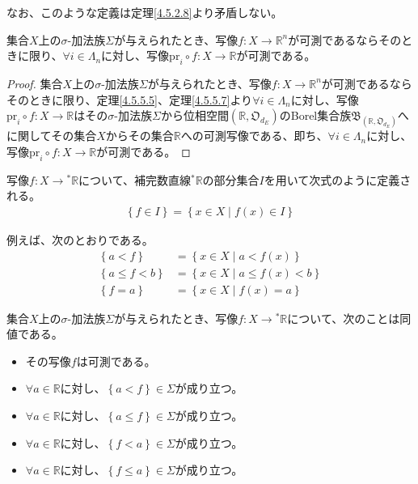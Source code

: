 \documentclass[dvipdfmx]{jsarticle}
\begin{document}
なお、このような定義は定理\ref{4.5.2.8}より矛盾しない。
\begin{thm}\label{4.5.5.8}
集合$X$上の$\sigma$-加法族$\varSigma$が与えられたとき、写像$f:X \rightarrow \mathbb{R}^{n}$が可測であるならそのときに限り、$\forall i \in \varLambda_{n}$に対し、写像$\mathrm{pr}_{i} \circ f:X \rightarrow \mathbb{R}$が可測である。
\end{thm}
\begin{proof}
集合$X$上の$\sigma$-加法族$\varSigma$が与えられたとき、写像$f:X \rightarrow \mathbb{R}^{n}$が可測であるならそのときに限り、定理\ref{4.5.5.5}、定理\ref{4.5.5.7}より$\forall i \in \varLambda_{n}$に対し、写像$\mathrm{pr}_{i} \circ f:X \rightarrow \mathbb{R}$はその$\sigma$-加法族$\varSigma$から位相空間$\left( \mathbb{R},\mathfrak{O}_{d_{E}} \right)$のBorel集合族$\mathfrak{B}_{\left( \mathbb{R},\mathfrak{O}_{d_{E}} \right)}$へに関してその集合$X$からその集合$\mathbb{R}$への可測写像である、即ち、$\forall i \in \varLambda_{n}$に対し、写像$\mathrm{pr}_{i} \circ f:X \rightarrow \mathbb{R}$が可測である。
\end{proof}
\begin{dfn}
写像$f:X \rightarrow{}^{*}\mathbb{R}$について、補完数直線${}^{*}\mathbb{R}$の部分集合$I$を用いて次式のように定義される。
\begin{align*}
\left\{ f \in I \right\} = \left\{ x \in X \middle| f(x) \in I \right\}
\end{align*}
\end{dfn}\par
例えば、次のとおりである。
\begin{align*}
\left\{ a < f \right\} &= \left\{ x \in X \middle| a < f(x) \right\}\\
\left\{ a \leq f < b \right\} &= \left\{ x \in X \middle| a \leq f(x) < b \right\}\\
\left\{ f = a \right\} &= \left\{ x \in X \middle| f(x) = a \right\}
\end{align*}
\begin{thm}\label{4.5.5.9}
集合$X$上の$\sigma$-加法族$\varSigma$が与えられたとき、写像$f:X \rightarrow{}^{*}\mathbb{R}$について、次のことは同値である。
\begin{itemize}
\item
  その写像$f$は可測である。
\item
  $\forall a \in \mathbb{R}$に対し、$\left\{ a < f \right\} \in \varSigma$が成り立つ。
\item
  $\forall a \in \mathbb{R}$に対し、$\left\{ a \leq f \right\} \in \varSigma$が成り立つ。
\item
  $\forall a \in \mathbb{R}$に対し、$\left\{ f < a \right\} \in \varSigma$が成り立つ。
\item
  $\forall a \in \mathbb{R}$に対し、$\left\{ f \leq a \right\} \in \varSigma$が成り立つ。
\end{itemize}
\end{thm}
\end{document}

